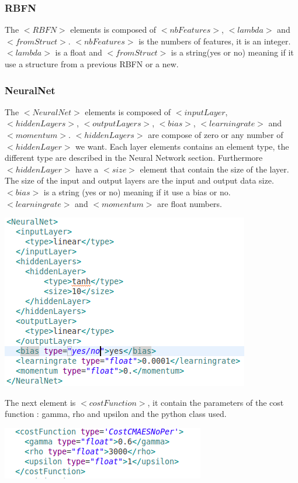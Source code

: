 \documentclass[a4paper]{article}
\begin{document}
\subsubsection*{RBFN}
The $<RBFN>$ elements is composed of $<nbFeatures>$, $<lambda>$ and $<fromStruct>$.
$<nbFeatures>$ is the numbers of features, it is an integer.
$<lambda>$ is a float and $<fromStruct>$ is a string(yes or no) meaning if it use a structure from a previous RBFN or a new.
\subsubsection*{NeuralNet}
The $<NeuralNet>$ elements is composed of $<inputLayer$, $<hiddenLayers>$, $<outputLayers>$, $<bias>$, $<learningrate>$ and $<momentum>$.
$<hiddenLayers>$ are compose of zero or any number of $<hiddenLayer>$ we want. Each layer elements contains an element type, the different type are described in the Neural Network section. Furthermore $<hiddenLayer>$ have a $<size>$ element that contain the size of the layer. The size of the input and output layers are the input and output data size.
$<bias>$ is a string (yes or no) meaning if it use a bias or no. $<learningrate>$ and $<momentum>$ are float numbers.
\begin{flushleft}
\includegraphics[scale=0.5]{XMLNeuralNet.png}
\end{flushleft}
The next element is $<costFunction>$, it contain the parameters of the cost function : gamma, rho and upsilon and the python class used.
\begin{flushleft}
\includegraphics[scale=0.5]{XMLCost.png}
\end{flushleft}
\end{document}
